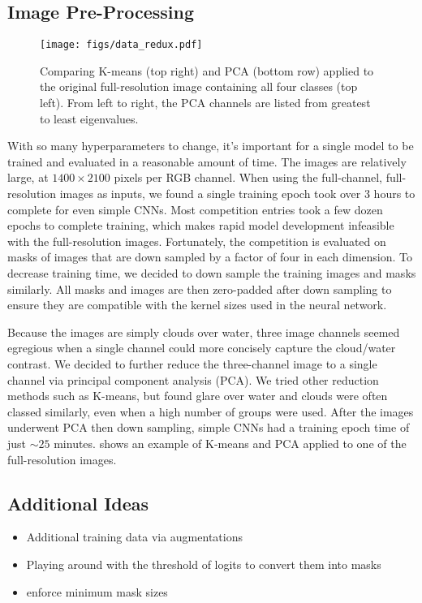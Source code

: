 \subsection{Image Pre-Processing}
\begin{figure}[htbp]
    \centering
    \texttt{[image: figs/data\_redux.pdf]}
    \caption{Comparing K-means (top right) and PCA (bottom row) applied to the original full-resolution image containing all four classes (top left). From left to right, the PCA channels are listed from greatest to least eigenvalues.}
    \label{fig:PCA}
\end{figure}
%
With so many hyperparameters to change, it's important for a single model to be trained and evaluated in a reasonable amount of time. The images are relatively large, at \(1400 \times 2100\) pixels per RGB channel. When using the full-channel, full-resolution images as inputs, we found a single training epoch took over 3 hours to complete for even simple CNNs. Most competition entries took a few dozen epochs to complete training, which makes rapid model development infeasible with the full-resolution images. Fortunately, the competition is evaluated on masks of images that are down sampled by a factor of four in each dimension. To decrease training time, we decided to down sample the training images and masks similarly. All masks and images are then zero-padded after down sampling to ensure they are compatible with the kernel sizes used in the neural network. 

Because the images are simply clouds over water, three image channels seemed egregious when a single channel could more concisely capture the cloud/water contrast. We decided to further reduce the three-channel image to a single channel via principal component analysis (PCA). We tried other reduction methods such as K-means, but found glare over water and clouds were often classed similarly, even when a high number of groups were used. After the images underwent PCA then down sampling, simple CNNs had a training epoch time of just \(\sim25\) minutes.  shows an example of K-means and PCA applied to one of the full-resolution images. 

\subsection{Additional Ideas}
\begin{itemize}
    \item Additional training data via augmentations 
    \item Playing around with the threshold of logits to convert them into masks 
    \item enforce minimum mask sizes 
\end{itemize}